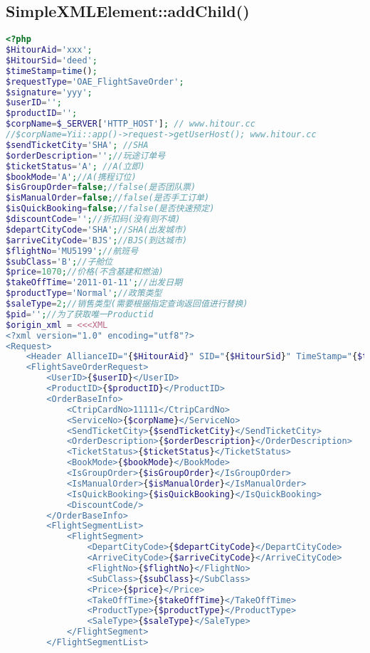 \subsection{SimpleXMLElement::addChild()}

\begin{lstlisting}[language=PHP]
<?php
$HitourAid='xxx';
$HitourSid='deed';
$timeStamp=time();
$requestType='OAE_FlightSaveOrder';
$signature='yyy';
$userID='';
$productID='';
$corpName=$_SERVER['HTTP_HOST']; // www.hitour.cc
//$corpName=Yii::app()->request->getUserHost(); www.hitour.cc
$sendTicketCity='SHA'; //SHA
$orderDescription='';//玩途订单号
$ticketStatus='A'; //A(立即)
$bookMode='A';//A(携程订位)
$isGroupOrder=false;//false(是否团队票)
$isManualOrder=false;//false(是否手工订单)
$isQuickBooking=false;//false(是否快速预定)
$discountCode='';//折扣码(没有则不填)
$departCityCode='SHA';//SHA(出发城市)
$arriveCityCode='BJS';//BJS(到达城市)
$flightNo='MU5199';//航班号
$subClass='B';//子舱位
$price=1070;//价格(不含基建和燃油)
$takeOffTime='2011-01-11';//出发日期
$productType='Normal';//政策类型
$saleType=2;//销售类型(需要根据指定查询返回值进行替换)
$pid='';//为了获取唯一Productid
$origin_xml = <<<XML
<?xml version="1.0" encoding="utf8"?>
<Request>
    <Header AllianceID="{$HitourAid}" SID="{$HitourSid}" TimeStamp="{$timeStamp}" RequestType="{$requestType}" Signature="{$signature}" />
    <FlightSaveOrderRequest>
        <UserID>{$userID}</UserID>
        <ProductID>{$productID}</ProductID>
        <OrderBaseInfo>
            <CtripCardNo>11111</CtripCardNo>
            <ServiceNo>{$corpName}</ServiceNo>
            <SendTicketCity>{$sendTicketCity}</SendTicketCity>
            <OrderDescription>{$orderDescription}</OrderDescription>
            <TicketStatus>{$ticketStatus}</TicketStatus>
            <BookMode>{$bookMode}</BookMode>
            <IsGroupOrder>{$isGroupOrder}</IsGroupOrder>
            <IsManualOrder>{$isManualOrder}</IsManualOrder>
            <IsQuickBooking>{$isQuickBooking}</IsQuickBooking>
            <DiscountCode/>
        </OrderBaseInfo>
        <FlightSegmentList>
            <FlightSegment>
                <DepartCityCode>{$departCityCode}</DepartCityCode>
                <ArriveCityCode>{$arriveCityCode}</ArriveCityCode>
                <FlightNo>{$flightNo}</FlightNo>
                <SubClass>{$subClass}</SubClass>
                <Price>{$price}</Price>
                <TakeOffTime>{$takeOffTime}</TakeOffTime>
                <ProductType>{$productType}</ProductType>
                <SaleType>{$saleType}</SaleType>
            </FlightSegment>
        </FlightSegmentList>

\end{lstlisting}
